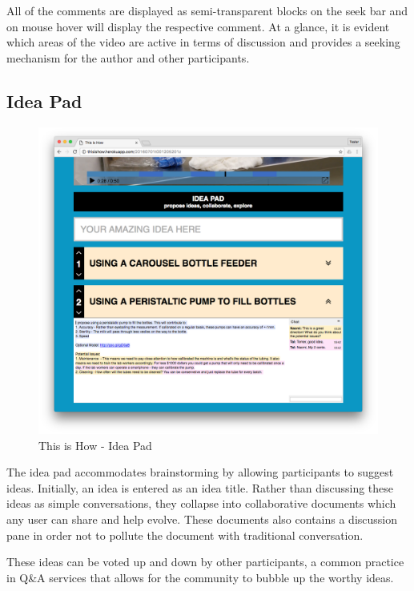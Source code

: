 
All of the comments are displayed as semi-transparent blocks on the seek bar and on mouse hover will display the respective comment. At a glance, it is evident which areas of the video are active in terms of discussion and provides a seeking mechanism for the author and other participants.  

\subsection{Idea Pad}

   \begin{figure}[thpb]
      \centering
      \includegraphics[width=\textwidth]{figures/ideapad-collapsed.png}
      \caption{This is How - Idea Pad}
      \label{fig_comment_thread}
   \end{figure}

The idea pad accommodates brainstorming by allowing participants to suggest ideas. Initially, an idea is entered as an idea title. Rather than discussing these ideas as simple conversations, they collapse into collaborative documents which any user can share and help evolve. These documents also contains a discussion pane in order not to pollute the document with traditional conversation. 

These ideas can be voted up and down by other participants, a common practice in Q\&A services\cite{stackoverflow}\cite{quora} that allows for the community to bubble up the worthy ideas.   